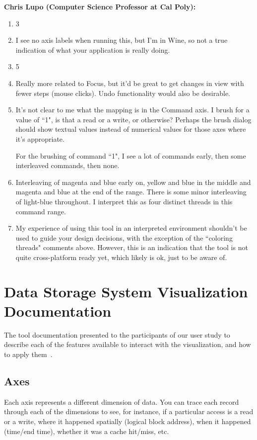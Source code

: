 \documentclass[12pt]{ucthesis}
\begin{document}
\textbf{Chris Lupo (Computer Science Professor at Cal Poly):}
\begin{enumerate}
\item 3
\item I see no axis labels when running this, but I'm in Wine, so not a true indication of what your application is really doing.
\item 5
\item Really more related to Focus, but it'd be great to get changes in view with fewer steps (mouse clicks). Undo functionality would also be desirable.
\item It's not clear to me what the mapping is in the Command axis. I brush for a value of ``1", is that a read or a write, or otherwise? Perhaps the brush dialog should show textual values instead of numerical values for those axes where it's appropriate.

For the brushing of command ``1", I see a lot of commands early, then some interleaved commands, then none.
\item Interleaving of magenta and blue early on, yellow and blue in the middle and magenta and blue at the end of the range. There is some minor interleaving of light-blue throughout. I interpret this as four distinct threads in this command range.
\item My experience of using this tool in an interpreted environment shouldn't be used to guide your design decisions, with the exception of the ``coloring threads" comments above. However, this is an indication that the tool is not quite cross-platform ready yet, which likely is ok, just to be aware of.
\end{enumerate}

\chapter{Data Storage System Visualization Documentation}
\label{tool:doc}
The tool documentation presented to the participants of our user study to describe each of the features available to interact with the visualization, and how to apply them~\cite{steven:doc}.

\section{Axes}
Each axis represents a different dimension of data. You can trace each record through each of the dimensions to see, for instance, if a particular access is a read or a write, where it happened spatially (logical block address), when it happened (time/end time), whether it was a cache hit/miss, etc.
\end{document}
